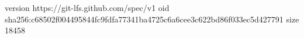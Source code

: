 version https://git-lfs.github.com/spec/v1
oid sha256:c68502f004495844fc9fdfa77341ba4725c6a6cee3c622bd86f033ec5d427791
size 18458
